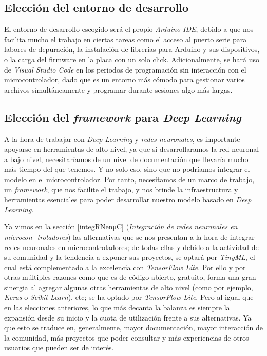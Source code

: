 \subsection{Elección del entorno de desarrollo}
El entorno de desarrollo escogido será el propio \textit{Arduino IDE}, debido
a que nos facilita mucho el trabajo en ciertas tareas como el acceso al puerto
serie para labores de depuración, la instalación de librerías para Arduino y
sus dispositivos, o la carga
del firmware en la placa con un solo click. Adicionalmente, se hará uso de
\textit{Visual Studio Code} en los periodos de programación sin interacción
con el microcontrolador, dado que es un entorno más cómodo para gestionar
varios archivos simultáneamente y programar durante sesiones algo más largas.

\subsection{Elección del \textit{framework} para \textit{Deep Learning}\label{fwDL}}
A la hora de trabajar con \textit{Deep Learning} y \textit{redes neuronales},
es importante apoyarse en herramientas de alto nivel, ya que si desarrollaramos
la red neuronal a bajo nivel, necesitaríamos de un nivel de documentación que
llevaría mucho más tiempo del que tenemos. Y no solo eso, sino que no podríamos integrar el
modelo en el microcontrolador. Por tanto, necesitamos de un marco de trabajo,
un \textit{framework}, que nos facilite el trabajo, y nos brinde la infraestructura
y herramientas esenciales para poder desarrollar nuestro modelo basado en
\textit{Deep Learning}.

Ya vimos en la sección \ref{integRNenμC} (\textit{Integración de redes neuronales en microcon-
troladores}) las alternativas que se nos presentan a la hora de integrar
redes neuronales en microcontroladores; de todas ellas y debido a la actividad
de su comunidad y la tendencia a exponer sus proyectos,
se optará por \textit{TinyML}, el cual está complementado a la excelencia con
\textit{TensorFlow Lite}. Por ello y por otras múltiples razones
como que es de código abierto, gratuito, forma una gran sinergia al agregar
algunas otras herramientas de alto nivel (como por ejemplo, \textit{Keras} o
\textit{Scikit Learn}), etc; se ha optado por \textit{TensorFlow Lite}.
Pero al igual que en las elecciones anteriores, lo que más decanta la balanza
es siempre la expansión desde su inicio y la cuota de utilización frente a sus
alternativas. Ya que esto se
traduce en, generalmente, mayor documentación, mayor interacción de la comunidad,
más proyectos que poder consultar y más experiencias de otros usuarios que pueden
ser de interés.


